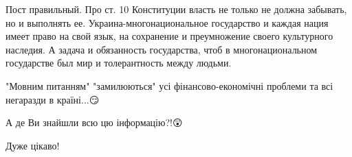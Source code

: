 \begin{itemize}
 
Пост правильный. Про ст. 10 Конституции власть не только не должна забывать, но
и выполнять ее. Украина-многонациональное государство и каждая нация имеет
право на свой язык, на сохранение и преумножение своего культурного наследия. А
задача и обязанность государства, чтоб в многонациональном государстве был мир
и толерантность между людьми.


"Мовним питанням" "замилюються" усі фінансово-економічні проблеми та всі
негаразди в країні...😏

А де Ви знайшли всю цю інформацію?!😲🧐

Дуже цікаво!🤔\Smiley[1.0][yellow]

\end{itemize}

